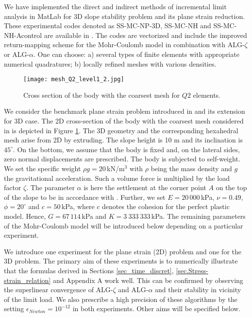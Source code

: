 \documentclass[a4paper,12pt]{article}
\theoremstyle{remark}
\numberwithin{equation}{section}
\begin{document}
We have implemented the direct and indirect methods of incremental limit analysis in MatLab for 3D slope stability problem and its plane strain reduction. These experimental codes denoted as SS-MC-NP-3D, SS-MC-NH and SS-MC-NH-Acontrol are available in \cite{Mcode}. The codes are vectorized and include the improved return-mapping scheme for the Mohr-Coulomb model in combination with ALG-$\zeta$ or ALG-$\alpha$.  One can choose: a) several types of finite elements with appropriate numerical quadratures; b) locally refined meshes with various densities. 

\begin{figure}[htbp]
\center
  \texttt{[image: mesh\_Q2\_level1\_2.jpg]}
   \caption{\small{Cross section of the body with the coarsest mesh for $Q2$ elements.}}
   \label{fig.mesh_Q2}
\end{figure}

We consider the benchmark plane strain problem introduced in \cite[Page 351]{NPO08} and its extension for 3D case.
The 2D cross-section of the body with the coarsest mesh considered in \cite[SS-MC-NH]{Mcode} is depicted in Figure \ref{fig.mesh_Q2}. The 3D geometry and the corresponding hexahedral mesh arise from 2D by extruding. The slope height is 10 m and its inclination is $45^\circ$. On the bottom, we assume that the body is fixed and, on the lateral sides,  zero normal displacements are prescribed. The body is subjected to self-weight. We set the specific weight $\rho g=20\, $kN/m$^3$ with $\rho$ being the mass density and $g$ the gravitational acceleration. Such a volume force is multiplied by the load factor $\zeta$. The parameter $\alpha$ is here the settlement at the corner point $A$ on the top of the slope to be in accordance with \cite{NPO08}.
Further, we set $E=20\,000\,$kPa, $\nu=0.49$, $\phi=20^{\circ}$ and $c=50\,$kPa, where $c$ denotes the cohesion for the perfect plastic model. Hence, $G=67\,114\, $kPa and $K=3\ 333\ 333\,$kPa. The remaining parameters of the Mohr-Coulomb model will be introduced below depending on a particular experiment.

We introduce one experiment for the plane strain (2D) problem and one for the 3D problem. The primary aim of these experiments is to numerically illustrate that the formulas derived in Sections \ref{sec_time_discret}, \ref{sec.Stress-strain_relation} and Appendix A work well. This can be confirmed by observing the superlinear convergence of ALG-$\zeta$ and ALG-$\alpha$ and their stability in vicinity of the limit load. We also prescribe a high precision of these algorithms by the setting $\epsilon_{Newton}=10^{-12}$ in both experiments. Other aims will be specified below.
\end{document}
